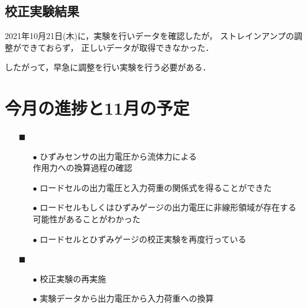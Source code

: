 \documentclass[twocolumn,a4j]{jsarticle}
\begin{document}
\subsection{校正実験結果}

2021年10月21日(木)に，実験を行いデータを確認したが，
ストレインアンプの調整ができておらず，
正しいデータが取得できなかった．\par
したがって，早急に調整を行い実験を行う必要がある．

\section{今月の進捗と11月の予定}
\begin{itemize}
    \item [$\blacksquare$] 
          \begin{itemize}
              \item [$\bullet$] ひずみセンサの出力電圧から流体力による\\
                    作用力への換算過程の確認
              \item [$\bullet$] ロードセルの出力電圧と入力荷重の関係式を得ることができた
              \item [$\bullet$] ロードセルもしくはひずみゲージの出力電圧に非線形領域が存在する可能性があることがわかった
              \item [$\bullet$] ロードセルとひずみゲージの校正実験を再度行っている\\
          \end{itemize}
    \item [$\blacksquare$] 
          \begin{itemize}
              \item [$\bullet$] 校正実験の再実施
              \item [$\bullet$] 実験データから出力電圧から入力荷重への換算\\
          \end{itemize}
\end{itemize}
\end{document}
